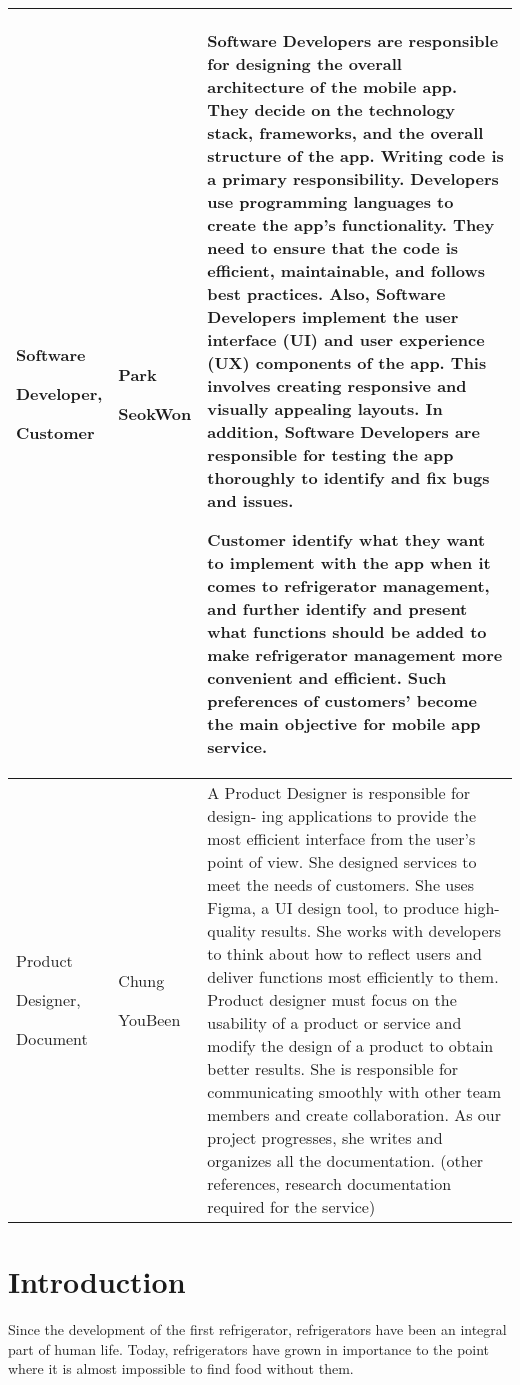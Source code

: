\documentclass[conference]{IEEEtran}
\begin{document}
\begin{table}
\begin{tabular}{| p{1.7cm}|p{1.5cm}|p{4.3cm} |}
\hline
Software  \par Developer,  \par Customer 
& Park \par SeokWon 
& Software	 Developers are responsible for designing the overall architecture of the mobile app. They decide on the technology stack, frameworks, and the overall structure of the app.
Writing code is a primary responsibility. Developers use programming languages to create the app's functionality. They need to ensure that the code is efficient, maintainable, and follows best practices. Also, Software Developers implement the user interface (UI) and user experience (UX) components of the app. This involves creating responsive and visually appealing layouts. In addition, Software Developers are responsible for testing the app thoroughly to identify and fix bugs and issues.
\par Customer identify what they want to implement with the app when it comes to refrigerator management, and further identify and present what functions should be added to make refrigerator management more convenient and efficient. Such preferences of customers’ become the main objective for mobile app service. \\
\hline
Product \par Designer,\par Document
& Chung \par YouBeen 
& A Product Designer is responsible for design- ing applications to provide the most efficient interface from the user’s point of view. 
She designed services to meet the needs of customers. She uses Figma, a UI design tool, to produce high-quality results.
 She works with developers to think about how to reflect users and deliver functions most efficiently to them.
Product designer must focus on the usability of a product or service and modify the design of a product to obtain better results. 
She is responsible for communicating smoothly with other team members and create collaboration.
 As our project progresses, she writes and organizes all the documentation.
(other references, research documentation required for the service)
 \\
\hline
\end{tabular}
\end{table}


\section{Introduction}
Since the development of the first refrigerator, refrigerators have been an integral part of human life. Today, refrigerators have grown in importance to the point where it is almost impossible to find food without them. 
\end{document}
